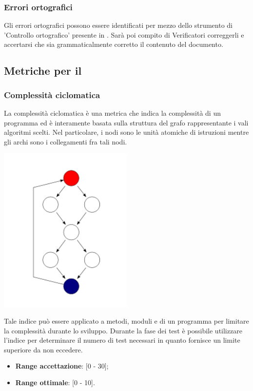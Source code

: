 \subsubsection{Errori ortografici}
Gli errori ortografici possono essere identificati per mezzo dello strumento di 'Controllo ortografico' presente in . Sarà poi compito di Verificatori correggerli e accertarsi che sia grammaticalmente corretto il contenuto del documento.

\subsection{Metriche per il }
\subsubsection{Complessità ciclomatica}
La complessità ciclomatica è una metrica che indica la complessità di un programma ed è interamente basata sulla struttura del grafo rappresentante i vali algoritmi scelti. Nel particolare, i nodi sono le unità atomiche di istruzioni mentre gli archi sono i collegamenti fra tali nodi.
\begin{center}
	\includegraphics[width=0.5\textwidth]{../includes/pics/ciclomatica.png}
\end{center}
Tale indice può essere applicato a metodi, moduli e  di un programma per limitare la complessità durante lo sviluppo. Durante la fase dei test è possibile utilizzare l'indice per determinare il numero di test necessari in quanto fornisce un limite superiore da non eccedere.
\begin{itemize}
	\item \textbf{Range accettazione}: [0 - 30];
	\item \textbf{Range ottimale}: [0 - 10].
\end{itemize}
